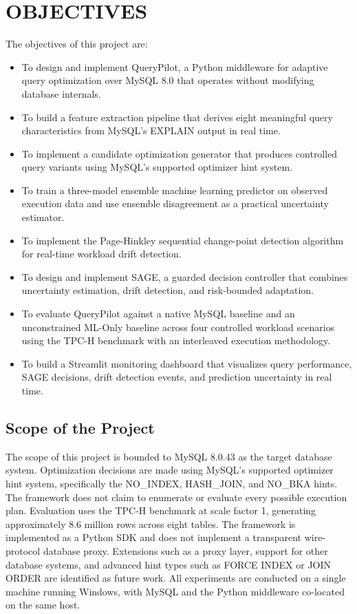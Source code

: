 \section{OBJECTIVES}
\label{sec:objectives}

The objectives of this project are:

\begin{itemize}[leftmargin=2em]
  \item To design and implement QueryPilot, a Python middleware for adaptive
        query optimization over MySQL 8.0 that operates without modifying
        database internals.
  \item To build a feature extraction pipeline that derives eight meaningful
        query characteristics from MySQL's EXPLAIN output in real time.
  \item To implement a candidate optimization generator that produces
        controlled query variants using MySQL's supported optimizer hint
        system.
  \item To train a three-model ensemble machine learning predictor on observed
        execution data and use ensemble disagreement as a practical uncertainty
        estimator.
  \item To implement the Page-Hinkley sequential change-point detection
        algorithm for real-time workload drift detection.
  \item To design and implement SAGE, a guarded decision controller that
        combines uncertainty estimation, drift detection, and risk-bounded
        adaptation.
  \item To evaluate QueryPilot against a native MySQL baseline and an
        unconstrained ML-Only baseline across four controlled workload
        scenarios using the TPC-H benchmark with an interleaved execution
        methodology.
  \item To build a Streamlit monitoring dashboard that visualizes query
        performance, SAGE decisions, drift detection events, and prediction
        uncertainty in real time.
\end{itemize}

\subsection{Scope of the Project}
\label{subsec:scope}

The scope of this project is bounded to MySQL 8.0.43 as the target database
system. Optimization decisions are made using MySQL's supported optimizer hint
system, specifically the NO\_INDEX, HASH\_JOIN, and NO\_BKA hints. The
framework does not claim to enumerate or evaluate every possible execution plan.
Evaluation uses the TPC-H benchmark at scale factor 1, generating approximately
8.6 million rows across eight tables. The framework is implemented as a Python
SDK and does not implement a transparent wire-protocol database proxy. Extensions
such as a proxy layer, support for other database systems, and advanced hint
types such as FORCE INDEX or JOIN ORDER are identified as future work. All
experiments are conducted on a single machine running Windows, with MySQL and
the Python middleware co-located on the same host.
